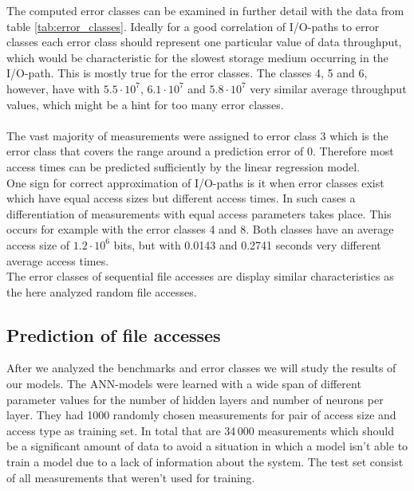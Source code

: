 \documentclass{superfri}
\begin{document}
The computed error classes can be examined in further detail with the data from table \ref{tab:error_classes}.
Ideally for a good correlation of I/O-paths to error classes each error class should represent one particular value of data throughput, which would be characteristic for the slowest storage medium occurring in the I/O-path. 
This is mostly true for the error classes. The classes 4, 5 and 6, however, have with $5.5\cdot10^7$, $6.1\cdot10^7$ and $5.8\cdot10^7$ very similar average throughput values, which might be a hint for too many error classes.\\
\\
The vast majority of measurements were assigned to error class 3 which is the error class that covers the range around a prediction error of 0.
Therefore most access times can be predicted sufficiently by the linear regression model.\\
One sign for correct approximation of I/O-paths is it when error classes exist which have equal access sizes but different access times.
In such cases a differentiation of measurements with equal access parameters takes place.
This occurs for example with the error classes 4 and 8. Both classes have an average access size of $1.2\cdot10^6$ bits, but with 0.0143 and 0.2741 seconds very different average access times.\\ 
The error classes of sequential file accesses are display similar characteristics as the here analyzed random file accesses.

\subsection{Prediction of file accesses}
After we analyzed the benchmarks and error classes we will study the results of our models.
The ANN-models were learned with a wide span of different parameter values for the number of hidden layers and number of neurons per layer.
They had 1000 randomly chosen measurements for pair of access size and access type as training set.
In total that are 34\,000 measurements which should be a significant amount of data to avoid a situation in which a model isn't able to train a model due to a lack of information about the system. The test set consist of all measurements that weren't used for training.\medskip
\end{document}
